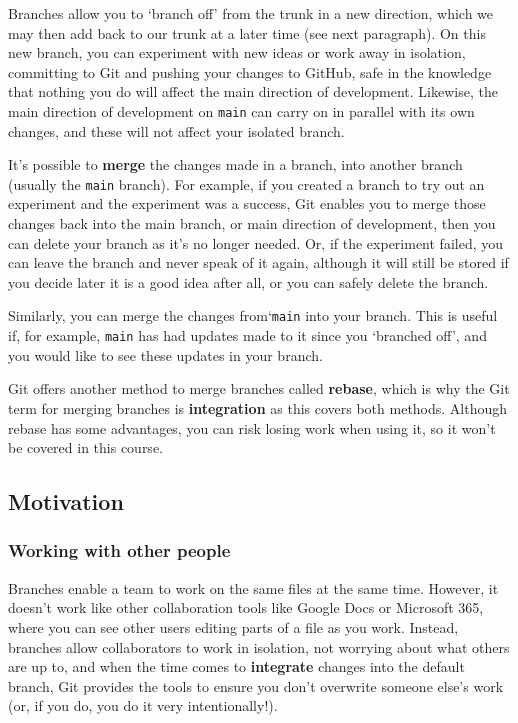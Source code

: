 \documentclass[
  letterpaper,
  DIV=11,
  numbers=noendperiod]{scrartcl}
\begin{document}
Branches allow you to `branch off' from the trunk in a new direction,
which we may then add back to our trunk at a later time (see next
paragraph). On this new branch, you can experiment with new ideas or
work away in isolation, committing to Git and pushing your changes to
GitHub, safe in the knowledge that nothing you do will affect the main
direction of development. Likewise, the main direction of development on
\texttt{main} can carry on in parallel with its own changes, and these
will not affect your isolated branch.

It's possible to \textbf{merge} the changes made in a branch, into
another branch (usually the \texttt{main} branch). For example, if you
created a branch to try out an experiment and the experiment was a
success, Git enables you to merge those changes back into the main
branch, or main direction of development, then you can delete your
branch as it's no longer needed. Or, if the experiment failed, you can
leave the branch and never speak of it again, although it will still be
stored if you decide later it is a good idea after all, or you can
safely delete the branch.

Similarly, you can merge the changes from`\texttt{main} into your
branch. This is useful if, for example, \texttt{main} has had updates
made to it since you `branched off', and you would like to see these
updates in your branch.

Git offers another method to merge branches called \textbf{rebase},
which is why the Git term for merging branches is \textbf{integration}
as this covers both methods. Although rebase has some advantages, you
can risk losing work when using it, so it won't be covered in this
course.

\subsection{Motivation}\label{motivation}

\subsubsection{Working with other
people}\label{working-with-other-people}

Branches enable a team to work on the same files at the same time.
However, it doesn't work like other collaboration tools like Google Docs
or Microsoft 365, where you can see other users editing parts of a file
as you work. Instead, branches allow collaborators to work in isolation,
not worrying about what others are up to, and when the time comes to
\textbf{integrate} changes into the default branch, Git provides the
tools to ensure you don't overwrite someone else's work (or, if you do,
you do it very intentionally!).
\end{document}
